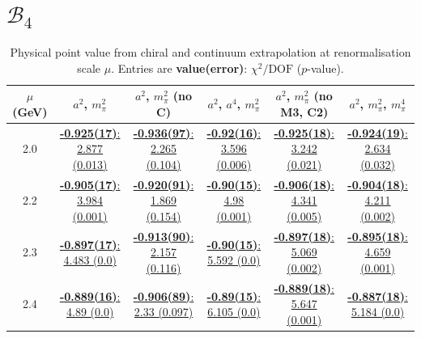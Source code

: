 \documentclass[12pt]{extarticle}
\begin{document}
\section{$\mathcal{B}_4$}
\begin{table}[h!]
\begin{center}
\begin{tabular}{|c|c|c|c|c|c|}
\hline
$\mu$ (GeV) & $a^2$, $m_\pi^2$& $a^2$, $m_\pi^2$ (no C)& $a^2$, $a^4$, $m_\pi^2$& $a^2$, $m_\pi^2$ (no M3, C2)& $a^2$, $m_\pi^2$, $m_\pi^4$\\
\hline
2.0& \hyperlink{SSpPP/NPR/a2m2_20.pdf.1}{\textbf{-0.925(17)}: 2.877 (0.013)} & \hyperlink{SSpPP/NPR/a2m2noC_20.pdf.1}{\textbf{-0.936(97)}: 2.265 (0.104)} & \hyperlink{SSpPP/NPR/a2a4m2_20.pdf.1}{\textbf{-0.92(16)}: 3.596 (0.006)} & \hyperlink{SSpPP/NPR/a2m2mcut_20.pdf.1}{\textbf{-0.925(18)}: 3.242 (0.021)} & \hyperlink{SSpPP/NPR/a2m2m4_20.pdf.1}{\textbf{-0.924(19)}: 2.634 (0.032)}\\
2.2& \hyperlink{SSpPP/NPR/a2m2_22.pdf.1}{\textbf{-0.905(17)}: 3.984 (0.001)} & \hyperlink{SSpPP/NPR/a2m2noC_22.pdf.1}{\textbf{-0.920(91)}: 1.869 (0.154)} & \hyperlink{SSpPP/NPR/a2a4m2_22.pdf.1}{\textbf{-0.90(15)}: 4.98 (0.001)} & \hyperlink{SSpPP/NPR/a2m2mcut_22.pdf.1}{\textbf{-0.906(18)}: 4.341 (0.005)} & \hyperlink{SSpPP/NPR/a2m2m4_22.pdf.1}{\textbf{-0.904(18)}: 4.211 (0.002)}\\
2.3& \hyperlink{SSpPP/NPR/a2m2_23.pdf.1}{\textbf{-0.897(17)}: 4.483 (0.0)} & \hyperlink{SSpPP/NPR/a2m2noC_23.pdf.1}{\textbf{-0.913(90)}: 2.157 (0.116)} & \hyperlink{SSpPP/NPR/a2a4m2_23.pdf.1}{\textbf{-0.90(15)}: 5.592 (0.0)} & \hyperlink{SSpPP/NPR/a2m2mcut_23.pdf.1}{\textbf{-0.897(18)}: 5.069 (0.002)} & \hyperlink{SSpPP/NPR/a2m2m4_23.pdf.1}{\textbf{-0.895(18)}: 4.659 (0.001)}\\
2.4& \hyperlink{SSpPP/NPR/a2m2_24.pdf.1}{\textbf{-0.889(16)}: 4.89 (0.0)} & \hyperlink{SSpPP/NPR/a2m2noC_24.pdf.1}{\textbf{-0.906(89)}: 2.33 (0.097)} & \hyperlink{SSpPP/NPR/a2a4m2_24.pdf.1}{\textbf{-0.89(15)}: 6.105 (0.0)} & \hyperlink{SSpPP/NPR/a2m2mcut_24.pdf.1}{\textbf{-0.889(18)}: 5.647 (0.001)} & \hyperlink{SSpPP/NPR/a2m2m4_24.pdf.1}{\textbf{-0.887(18)}: 5.184 (0.0)}\\
\hline
\end{tabular}
\caption{Physical point value from chiral and continuum extrapolation at renormalisation scale $\mu$. Entries are \textbf{value(error)}: $\chi^2/\text{DOF}$ ($p$-value).}
\end{center}
\end{table}
\end{document}
